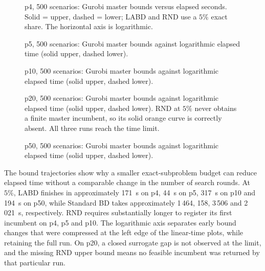 \begin{figure}[tbp]\centering
{}
\caption{p4, 500 scenarios: Gurobi master bounds versus elapsed seconds. Solid = upper, dashed = lower; LABD and RND use a $5\%$ exact share. The horizontal axis is logarithmic.}\label{fig:bounds-p4}
\end{figure}

\begin{figure}[tbp]\centering
{}
\caption{p5, 500 scenarios: Gurobi master bounds against logarithmic elapsed time (solid upper, dashed lower).}\label{fig:bounds-p5}
\end{figure}

\begin{figure}[tbp]\centering
{}
\caption{p10, 500 scenarios: Gurobi master bounds against logarithmic elapsed time (solid upper, dashed lower).}\label{fig:bounds-p10}
\end{figure}

\begin{figure}[tbp]\centering
{}
\caption{p20, 500 scenarios: Gurobi master bounds against logarithmic elapsed time (solid upper, dashed lower). RND at $5\%$ never obtains a finite master incumbent, so its solid orange curve is correctly absent. All three runs reach the time limit.}\label{fig:bounds-p20}
\end{figure}

\begin{figure}[tbp]\centering
{}
\caption{p50, 500 scenarios: Gurobi master bounds against logarithmic elapsed time (solid upper, dashed lower).}\label{fig:bounds-p50}
\end{figure}

The bound trajectories show why a smaller exact-subproblem budget can reduce elapsed time without a comparable change in the number of search rounds. At $5\%$, LABD finishes in approximately 171~s on p4, 44~s on p5, 317~s on p10 and 194~s on p50, while Standard BD takes approximately 1\,464, 158, 3\,506 and 2\,021~s, respectively. RND requires substantially longer to register its first incumbent on p4, p5 and p10. The logarithmic axis separates early bound changes that were compressed at the left edge of the linear-time plots, while retaining the full run. On p20, a closed surrogate gap is not observed at the limit, and the missing RND upper bound means no feasible incumbent was returned by that particular run.

